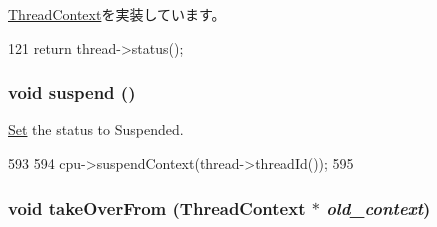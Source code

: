 \hyperlink{classThreadContext_adfba9b39542cba955a02b8ff3ba023a9}{ThreadContext}を実装しています。


\begin{DoxyCode}
121 { return thread->status(); }
\end{DoxyCode}
\hypertarget{classOzoneCPU_1_1OzoneTC_a3605b58fb45d69d498721bc2f2a14b1c}{
\subsubsection[{suspend}]{\setlength{\rightskip}{0pt plus 5cm}void suspend ()}}
\label{classOzoneCPU_1_1OzoneTC_a3605b58fb45d69d498721bc2f2a14b1c}


\hyperlink{classSet}{Set} the status to Suspended. 


\begin{DoxyCode}
593 {
594     cpu->suspendContext(thread->threadId());
595 }
\end{DoxyCode}
\hypertarget{classOzoneCPU_1_1OzoneTC_af121f4812cba8e37d675cddada8e47ed}{
\subsubsection[{takeOverFrom}]{\setlength{\rightskip}{0pt plus 5cm}void takeOverFrom ({\bf ThreadContext} $\ast$ {\em old\_\-context})}}
\label{classOzoneCPU_1_1OzoneTC_af121f4812cba8e37d675cddada8e47ed}



